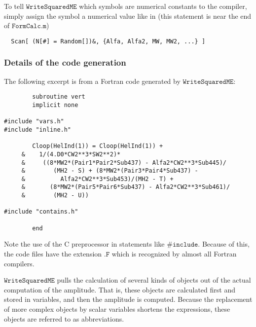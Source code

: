 \documentclass[twoside,11pt]{article}
\def\Code#1{\ensuremath{\texttt{#1}}}
\begin{document}
To tell \Code{WriteSquaredME} which symbols are numerical constants to
the compiler, simply assign the symbol a numerical value like in (this
statement is near the end of \Code{FormCalc.m})
\begin{verbatim}
  Scan[ (N[#] = Random[])&, {Alfa, Alfa2, MW, MW2, ...} ]
\end{verbatim}


\subsubsection*{Details of the code generation}

The following excerpt is from a Fortran code generated by 
\Code{WriteSquaredME}:
\begin{verbatim}
        subroutine vert
        implicit none

#include "vars.h"
#include "inline.h"

        Cloop(HelInd(1)) = Cloop(HelInd(1)) + 
     &    1/(4.D0*CW2**3*SW2**2)*
     &     ((8*MW2*(Pair1*Pair2*Sub437) - Alfa2*CW2**3*Sub445)/
     &        (MH2 - S) + (8*MW2*(Pair3*Pair4*Sub437) - 
     &          Alfa2*CW2**3*Sub453)/(MH2 - T) + 
     &       (8*MW2*(Pair5*Pair6*Sub437) - Alfa2*CW2**3*Sub461)/
     &        (MH2 - U))

#include "contains.h"

        end
\end{verbatim}
Note the use of the C preprocessor in statements like \Code{\#include}.
Because of this, the code files have the extension \Code{.F} which is
recognized by almost all Fortran compilers.

\Code{WriteSquaredME} pulls the calculation of several kinds of objects
out of the actual computation of the amplitude.  That is, these objects
are calculated first and stored in variables, and then the amplitude is
computed.  Because the replacement of more complex objects by scalar
variables shortens the expressions, these objects are referred to as
abbreviations.
\end{document}
